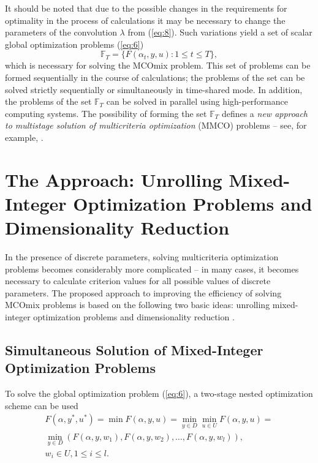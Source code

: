 \documentclass{svproc}
\begin{document}
It should be noted that due to the possible changes in the requirements for optimality in the process of calculations it may be necessary to change the parameters of the convolution $\lambda$ from (\ref{eq:8}). Such variations yield a set of scalar global optimization problems (\ref{eq:6})
\begin{equation}\label{eq:10}
\mathbb{F}_T=\{F(\alpha_t,y , u):1 \leq t \leq T\},
\end{equation}
which is necessary for solving the MCOmix problem. This set of problems can be formed sequentially in the course of calculations; the problems of the set can be solved strictly sequentially or simultaneously in time-shared mode. In addition, the problems of the set $\mathbb{F}_T$ can be solved in parallel using high-performance computing systems. The possibility of forming the set $\mathbb{F}_T$ defines a \textit{new approach to multistage solution of multicriteria optimization} (MMCO) problems -- see, for example, \cite{c22}.


\section{The Approach: Unrolling Mixed-Integer Optimization Problems and Dimensionality Reduction}\label{sec:3}

In the presence of discrete parameters, solving multicriteria optimization  problems becomes considerably  more complicated -- in many cases, it becomes necessary to calculate criterion values for all possible values of discrete parameters. The proposed approach to improving the efficiency of solving MCOmix problems is based on the following two basic ideas: unrolling mixed-integer optimization problems \cite{c23} and dimensionality reduction \cite{c24,c25}.

\subsection{Simultaneous Solution of Mixed-Integer Optimization Problems} \label{subsec:31}

To solve the global optimization problem (\ref{eq:6}), a two-stage nested optimization scheme can be used
\begin{equation}\label{eq:11}
\begin{matrix}
  F(\alpha,y^*,u^*)=\min{F(\alpha,y,u)} = \min_{y \in D} \min_{u \in U}{F(\alpha,y,u)} = \\ 
  \min_{y \in D}(F(\alpha,y,w_1 ),F(\alpha,y,w_2 ), \dots, F(\alpha,y,w_l )),\\
	w_i\in U,1 \leq i \leq l.
\end{matrix}
\end{equation}
\end{document}
